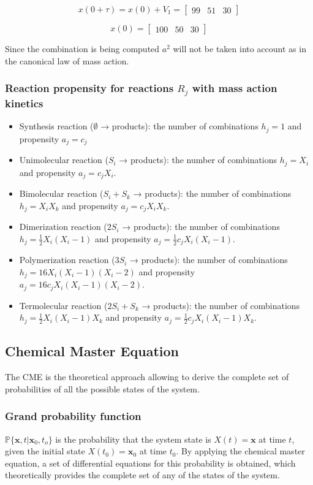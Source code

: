   $$x(0+ \tau) = x(0) + V_1 = \begin{bmatrix}99 &51& 30 \end{bmatrix}$$

  $$x(0) = \begin{bmatrix}100 &50& 30 \end{bmatrix}$$

  Since the combination is being computed $a^2$ will not be taken into account as in the canonical law of mass action.

    \subsubsection{Reaction propensity for reactions $ R_j$ with mass action kinetics}

    \begin{itemize}
      \item Synthesis reaction ($\emptyset$ → products): the number of combinations $ h_j = 1 $ and propensity $ a_j =c_j $
      \item Unimolecular reaction ($ S_i$ → products): the number of combinations $h_j= X_i$ and propensity $ a_j = c_jX_i $.
      \item Bimolecular reaction ($ S_i + S_k$ → products): the number of combinations $ h_j = X_iX_k$ and propensity $ a_j = c_jX_iX_k $.
      \item Dimerization reaction ($2S_i$ → products): the number of combinations $ h_j = \frac{1}{2}X_i(X_i -1) $ and propensity $ a_j = \frac{1}{2}c_jX_i(X_i -1) $.
      \item Polymerization reaction ($3S_i$ → products): the number of combinations $ h_j = 16X_i(X_i -1)(X_i -2)$ and propensity $ a_j = 16c_jX_i(X_i -1)(X_i -2) $.
      \item Termolecular reaction ($2S_i + S_k$ → products): the number of combinations $ h_j = \frac{1}{2}X_i(X_i -1)X_k$ and propensity $ a_j = \frac{1}{2}c_jX_i(X_i -1)X_k $.
    \end{itemize}


  \subsection{Chemical Master Equation}
  The CME is the theoretical approach allowing to derive the complete set of probabilities of all the possible states of the system.

    \subsubsection{Grand probability function}
    $\mathbb{P}\{\mathbf{x},t|\mathbf{x}_0,t_o\}$ is the probability that the system state is $X(t) = \mathbf{x}$ at time $t$, given the initial state $X(t_0) = \mathbf{x}_0$ at time $t_0$.
    By applying the chemical master equation, a set of differential equations for this probability is obtained, which theoretically provides the complete set of any of the states of the system.

